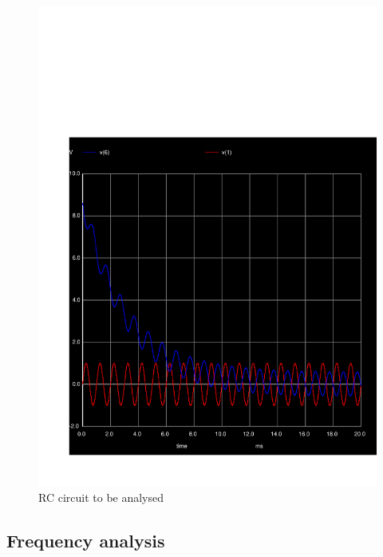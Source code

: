   \begin{figure}[H] \centering
    \includegraphics[width=1\linewidth]{../sim/trans4.pdf}
    \caption{RC circuit to be analysed}
    \label{fig:t2}
    \end{figure}

  \subsection{Frequency analysis}

